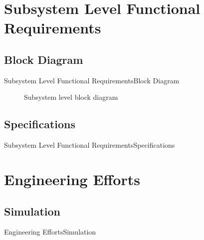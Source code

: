 \documentclass{beamer}
\begin{document}

\section{Subsystem Level Functional Requirements}



\subsection{Block Diagram}

\begin{frame}{Subsystem Level Functional Requirements}{Block Diagram}

\begin{figure}
  \centering
    \caption{Subsystem level block diagram}
    \label{fig:subsysblock}
\end{figure}

\end{frame}


\subsection{Specifications}

\begin{frame}{Subsystem Level Functional Requirements}{Specifications}

\end{frame}


\section{Engineering Efforts}

\subsection{Simulation}

\begin{frame}{Engineering Efforts}{Simulation}
  
\end{frame}
\end{document}
